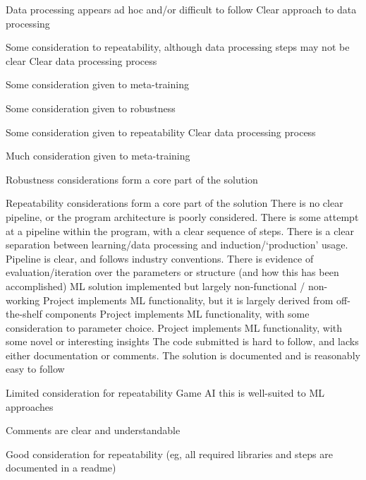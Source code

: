 \documentclass{../fal_assignment}
\begin{document}
\rubricmasters
\rubrichead{\ }
\begin{markingrubric}
%
        \grade \fail Data processing appears ad hoc and/or difficult to follow
        \grade Clear approach to data processing
        	\par Some consideration to repeatability, although data processing steps may not be clear
        \grade Clear data processing process
            \par Some consideration given to meta-training
            \par Some consideration given to robustness
            \par Some consideration given to repeatability
        \grade Clear data processing process
            \par Much consideration given to meta-training
            \par Robustness considerations form a core part of the solution
            \par Repeatability considerations form a core part of the solution
%
	\grade \fail There is no clear pipeline, or the program architecture is poorly considered.
	\grade There is some attempt at a pipeline within the program, with a clear sequence of steps.
	\grade There is a clear separation between learning/data processing and induction/`production' usage.
	\grade Pipeline is clear, and follows industry conventions. There is evidence of evaluation/iteration over the parameters or structure (and how this has been accomplished)
%
        \grade \fail ML solution implemented but largely non-functional / non-working
        \grade Project implements ML functionality, but it is largely derived from off-the-shelf components
        \grade Project implements ML functionality, with some consideration to parameter choice.
        \grade Project implements ML functionality, with some novel or interesting insights
%
        \grade \fail The code submitted is hard to follow, and lacks either documentation or comments.
        \grade The solution is documented and is reasonably easy to follow
            \par Limited consideration for repeatability
        \grade Game AI this is well-suited to ML approaches
            \par Comments are clear and understandable
            \par Good consideration for repeatability (eg, all required libraries and steps are documented in a readme)

\end{markingrubric}
\end{document}
